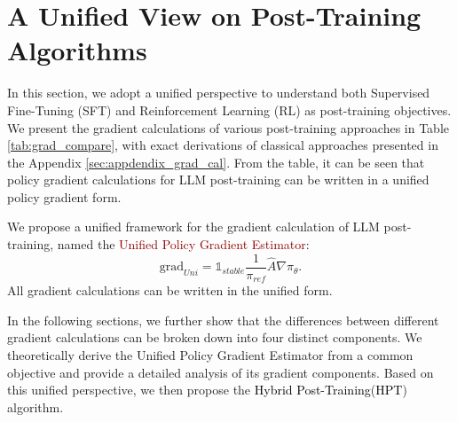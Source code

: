 \documentclass{article} %
\newcommand{\0}{\mathbb{0}}
\newcommand{\1}{\mathbb{1}}
\newcommand{\method}{\textcolor{black}{Hybrid Post-Training}\xspace}
\newcommand{\mot}{\textcolor{black}{HPT}\xspace}
\begin{document}




\section{A Unified View on Post-Training Algorithms} \label{sec:unified-view}

In this section, we adopt a unified perspective to understand both Supervised Fine-Tuning (SFT) and Reinforcement Learning (RL) as post-training objectives.
We present the gradient calculations of various post-training approaches in Table \ref{tab:grad_compare}, with exact derivations of classical approaches presented in the Appendix \ref{sec:appdendix_grad_cal}. From the table, it can be seen that policy gradient calculations for LLM post-training can be written in a unified policy gradient form. 

\begin{tcolorbox}[takeawaysbox]
We propose a unified framework for the gradient calculation of LLM post-training, named the \textcolor{darkred}{Unified Policy Gradient Estimator}:
$$ \text{grad}_{Uni} = \mathbb{1}_{stable} \frac{1}{\pi_{ref}} \hat{A} \nabla \pi_{\theta}.$$All gradient calculations can be written in the unified form.
\end{tcolorbox}


In the following sections, we further show that the differences between different gradient calculations can be broken down into four distinct components.
We theoretically derive the Unified Policy Gradient Estimator from a common objective and provide a detailed analysis of its gradient components. Based on this unified perspective, we then propose the \method (\mot) algorithm.






        
\end{document}
